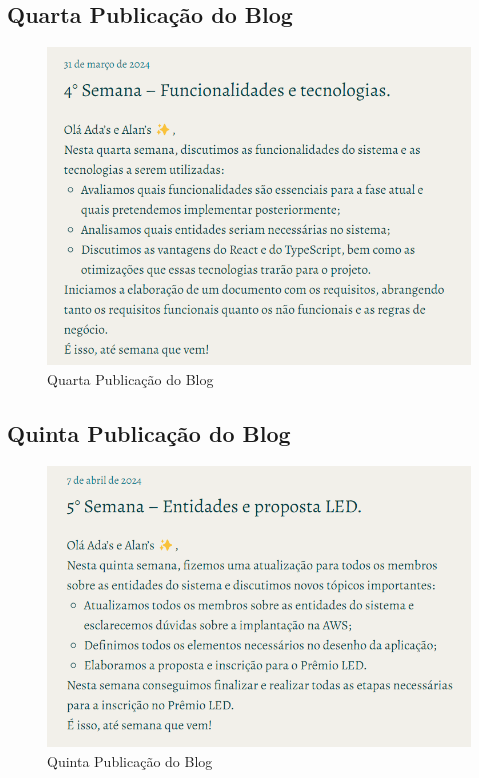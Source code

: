 \begin{apendicesenv}
\subsection*{Quarta Publicação do Blog}
\begin{figure}[H]
    \centering
    \includegraphics[width=1.0\linewidth]{images/Post4.png}
    \caption{Quarta Publicação do Blog}
    \label{fig:quarta}
\end{figure}

\subsection*{Quinta Publicação do Blog}
\begin{figure}[H]
    \centering
    \includegraphics[width=1.0\linewidth]{images/Post5.png}
    \caption{Quinta Publicação do Blog}
    \label{fig:quinta}
\end{figure}


\end{apendicesenv}
